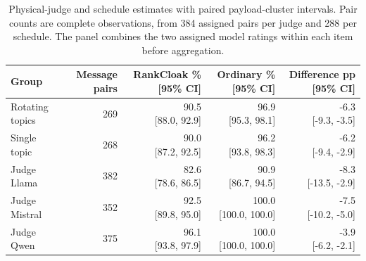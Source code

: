 \begin{table}[H]\centering\small\begin{tabular}{lrrrr}\toprule

Group & Message pairs & RankCloak \% [95\% CI] & Ordinary \% [95\% CI] & Difference pp [95\% CI]\\\midrule

Rotating topics & 269 & \shortstack{90.5\\{}[88.0, 92.9]} & \shortstack{96.9\\{}[95.3, 98.1]} & \shortstack{-6.3\\{}[-9.3, -3.5]}\\

Single topic & 268 & \shortstack{90.0\\{}[87.2, 92.5]} & \shortstack{96.2\\{}[93.8, 98.3]} & \shortstack{-6.2\\{}[-9.4, -2.9]}\\

Judge Llama & 382 & \shortstack{82.6\\{}[78.6, 86.5]} & \shortstack{90.9\\{}[86.7, 94.5]} & \shortstack{-8.3\\{}[-13.5, -2.9]}\\

Judge Mistral & 352 & \shortstack{92.5\\{}[89.8, 95.0]} & \shortstack{100.0\\{}[100.0, 100.0]} & \shortstack{-7.5\\{}[-10.2, -5.0]}\\

Judge Qwen & 375 & \shortstack{96.1\\{}[93.8, 97.9]} & \shortstack{100.0\\{}[100.0, 100.0]} & \shortstack{-3.9\\{}[-6.2, -2.1]}\\

\bottomrule\end{tabular}\caption{Physical-judge and schedule estimates with paired payload-cluster intervals. Pair counts are complete observations, from 384 assigned pairs per judge and 288 per schedule. The panel combines the two assigned model ratings within each item before aggregation.}\label{tab:v4-contextual-strata}\end{table}

\label{si:v4-contextual-missingness}

